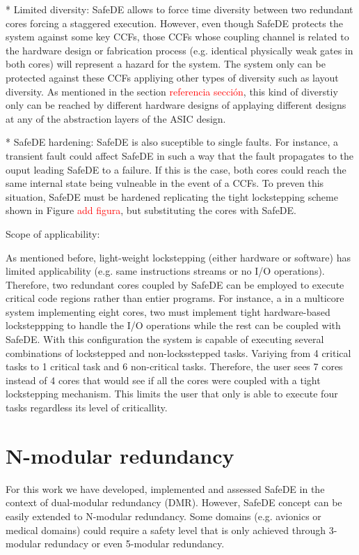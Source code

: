 * Limited diversity: SafeDE allows to force time diversity between two redundant cores forcing a staggered execution. However, even though SafeDE protects the system against some key CCFs, those CCFs whose coupling channel is related to the hardware design or fabrication process (e.g. identical physically weak gates in both cores) will represent a hazard for the system. The system only can be protected against these CCFs appliying other types of diversity such as layout diversity. As mentioned in the section \textcolor{red}{referencia sección}, this kind of diverstiy only can be reached by different hardware designs of applaying different designs at any of the abstraction layers of the ASIC design.

* SafeDE hardening: SafeDE is also suceptible to single faults. For instance, a transient fault could affect SafeDE in such a way that the fault propagates to the ouput leading SafeDE to a failure. If this is the case, both cores could reach the same internal state being vulneable in the event of a CCFs. To preven this situation, SafeDE must be hardened replicating the tight lockstepping scheme shown in Figure \textcolor{red}{add figura}, but substituting the cores with SafeDE.



Scope of applicability:

As mentioned before, light-weight lockstepping (either hardware or software) has limited applicability (e.g. same instructions streams or no I/O operations). Therefore, two redundant cores coupled by SafeDE can be employed to execute critical code regions rather than entier programs. For instance, a in a multicore system implementing eight cores, two must implement tight hardware-based locksteppping to handle the I/O operations while the rest can be coupled with SafeDE. With this configuration the system is capable of executing several combinations of lockstepped  and non-locksstepped tasks. Variying from 4 critical tasks to 1 critical task and 6 non-critical tasks. Therefore, the user sees 7 cores instead of 4 cores that would see if all the cores were coupled with a tight lockstepping mechanism. This limits the user that only is able to execute four tasks regardless its level of criticallity.


\section{N-modular redundancy}
For this work we have developed, implemented and assessed SafeDE in the context of dual-modular redundancy (DMR). However, SafeDE concept can be easily extended to N-modular redundancy. Some domains (e.g. avionics or medical domains) could require a safety level that is only achieved through 3-modular redundacy or even 5-modular redundancy. 

